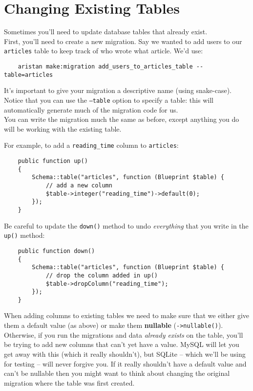 \section{Changing Existing Tables}

Sometimes you'll need to update database tables that already exist.
\\

First, you'll need to create a new migration. Say we wanted to add users to our \texttt{articles} table to keep track of who wrote what article. We'd use:

\begin{verbatim}
    aristan make:migration add_users_to_articles_table --table=articles
\end{verbatim}

It's important to give your migration a descriptive name (using snake-case). Notice that you can use the \texttt{--table} option to specify a table: this will automatically generate much of the migration code for us.
\\

You can write the migration much the same as before, except anything you do will be working with the existing table.

\pagebreak

For example, to add a \texttt{reading\_time} column to \texttt{articles}:

\begin{verbatim}
    public function up()
    {
        Schema::table("articles", function (Blueprint $table) {
            // add a new column
            $table->integer("reading_time")->default(0);
        });
    }
\end{verbatim}

Be careful to update the \texttt{down()} method to undo \textit{everything} that you write in the \texttt{up()} method:

\begin{verbatim}
    public function down()
    {
        Schema::table("articles", function (Blueprint $table) {
            // drop the column added in up()
            $table->dropColumn("reading_time");
        });
    }
\end{verbatim}

When adding columns to existing tables we need to make sure that we either give them a default value (as above) or make them \textbf{nullable} (\texttt{->nullable()}). Otherwise, if you run the migrations and data \textit{already exists} on the table, you'll be trying to add new columns that can't yet have a value. MySQL will let you get away with this (which it really shouldn't), but SQLite – which we'll be using for testing – will never forgive you. If it really shouldn't have a default value and can't be nullable then you might want to think about changing the original migration where the table was first created.


